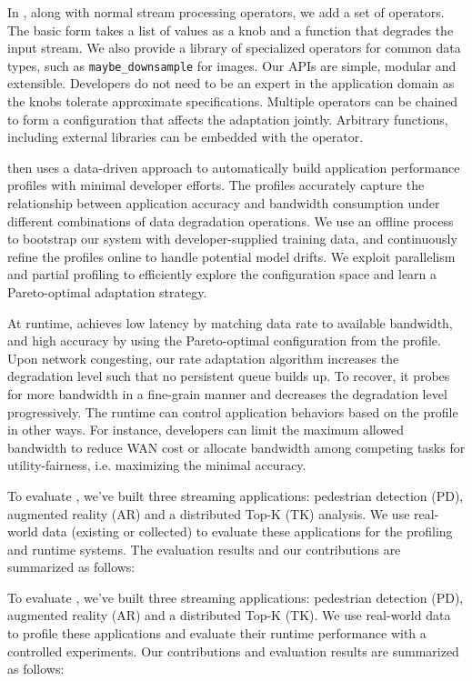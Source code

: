 In \sysname{}, along with normal stream processing operators, we add a set of
\maybe{} operators. The basic form takes a list of values as a knob and a
function that degrades the input stream. We also provide a library of
specialized operators for common data types, such as \texttt{maybe\_downsample}
for images.  Our APIs are simple, modular and extensible. Developers do not need
to be an expert in the application domain as the knobs tolerate approximate
specifications. Multiple operators can be chained to form a configuration that
affects the adaptation jointly. Arbitrary functions, including external
libraries can be embedded with the operator.

\sysname{} then uses a data-driven approach to automatically build application
performance profiles with minimal developer efforts. The profiles accurately
capture the relationship between application accuracy and bandwidth consumption
under different combinations of data degradation operations. We use an offline
process to bootstrap our system with developer-supplied training data, and
continuously refine the profiles online to handle potential model drifts. We
exploit parallelism and partial profiling to efficiently explore the
configuration space and learn a Pareto-optimal adaptation strategy.

At runtime, \sysname{} achieves low latency by matching data rate to available
bandwidth, and high accuracy by using the Pareto-optimal configuration from the
profile. Upon network congesting, our rate adaptation algorithm increases the
degradation level such that no persistent queue builds up. To recover, it probes
for more bandwidth in a fine-grain manner and decreases the degradation level
progressively. The runtime can control application behaviors based on the
profile in other ways. For instance, developers can limit the maximum allowed
bandwidth to reduce WAN cost or allocate bandwidth among competing tasks for
utility-fairness, i.e. maximizing the minimal accuracy.

To evaluate \sysname{}, we've built three streaming applications: pedestrian
detection (PD), augmented reality (AR) and a distributed Top-K (TK) analysis. We
use real-world data (existing or collected) to evaluate these applications for
the profiling and runtime systems. The evaluation results and our contributions
are summarized as follows:

To evaluate \sysname{}, we've built three streaming applications: pedestrian
detection (PD), augmented reality (AR) and a distributed Top-K (TK). We use
real-world data to profile these applications and evaluate their runtime
performance with a controlled experiments. Our contributions and evaluation
results are summarized as follows:

